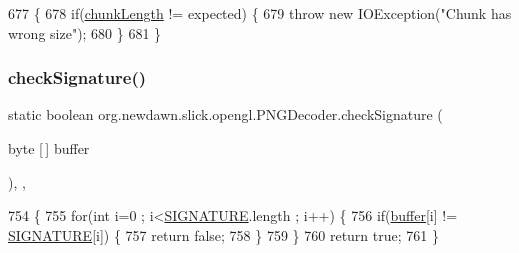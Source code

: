 \begin{DoxyCode}
677                                                                    \{
678         \textcolor{keywordflow}{if}(\mbox{\hyperlink{classorg_1_1newdawn_1_1slick_1_1opengl_1_1_p_n_g_decoder_aeb23de3eba5a6505ee1dd16094f78d7b}{chunkLength}} != expected) \{
679             \textcolor{keywordflow}{throw} \textcolor{keyword}{new} IOException(\textcolor{stringliteral}{"Chunk has wrong size"});
680         \}
681     \}
\end{DoxyCode}
\mbox{\label{classorg_1_1newdawn_1_1slick_1_1opengl_1_1_p_n_g_decoder_a025dcd998650265f0d15edd6c68c049d}} 
\subsubsection{\texorpdfstring{check\+Signature()}{checkSignature()}}
{\footnotesize\ttfamily static boolean org.\+newdawn.\+slick.\+opengl.\+P\+N\+G\+Decoder.\+check\+Signature (\begin{DoxyParamCaption}\item[{byte \mbox{[}$\,$\mbox{]}}]{buffer }\end{DoxyParamCaption})\hspace{0.3cm}{\ttfamily [inline]}, {\ttfamily [static]}, {\ttfamily [private]}}


\begin{DoxyCode}
754                                                          \{
755         \textcolor{keywordflow}{for}(\textcolor{keywordtype}{int} i=0 ; i<\mbox{\hyperlink{classorg_1_1newdawn_1_1slick_1_1opengl_1_1_p_n_g_decoder_a150f394aab124e6e1fe24130c0ca6879}{SIGNATURE}}.length ; i++) \{
756             \textcolor{keywordflow}{if}(\mbox{\hyperlink{classorg_1_1newdawn_1_1slick_1_1opengl_1_1_p_n_g_decoder_ae205f9222586a2bc01a8a240c5c210ad}{buffer}}[i] != \mbox{\hyperlink{classorg_1_1newdawn_1_1slick_1_1opengl_1_1_p_n_g_decoder_a150f394aab124e6e1fe24130c0ca6879}{SIGNATURE}}[i]) \{
757                 \textcolor{keywordflow}{return} \textcolor{keyword}{false};
758             \}
759         \}
760         \textcolor{keywordflow}{return} \textcolor{keyword}{true};
761     \}
\end{DoxyCode}
\mbox{\label{classorg_1_1newdawn_1_1slick_1_1opengl_1_1_p_n_g_decoder_a8be80afb9e66943952de1e7d429303ac}} 
